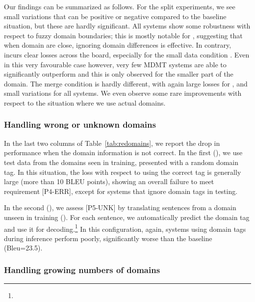 Our findings can be summarized as follows. For the split experiments, we see small variations that can be positive or negative compared to the baseline situation, but these are hardly significant. All systems show some robustness with respect to fuzzy domain boundaries; this is mostly notable for , suggesting that when domain are close, ignoring domain differences is effective. In contrary,  incurs clear losses across the board, especially for the small data condition \cite{Miceli17regularization}. Even in this very favourable case however, very few MDMT systems are able to significantly outperform  and this is only observed for the smaller part of the  domain. The merge condition is hardly different, with again large losses for  , and small variations for all systems. We even observe some rare improvements with respect to the situation where we use actual domains. 

\subsubsection{Handling wrong or unknown domains \label{sssec:unknowns}}

In the last two columns of Table~\ref{tab:redomains}, we report the drop in performance when the domain information is not correct. In the first (), we use test data from the domains seen in training, presented with a random domain tag. In this situation, the loss with respect to using the correct tag is generally large (more than 10 BLEU points), showing an overall failure to meet requirement [P4-ERR], except for systems that ignore domain tags in testing. 

In the second (), we assess [P5-UNK] by translating sentences from a domain unseen in training (). For each sentence, we automatically predict the domain tag and use it for decoding.\footnote{}
In this configuration, again, systems using domain tags during inference perform poorly, significantly worse than the  baseline (Bleu=23.5).

\subsubsection{Handling growing numbers of domains}


